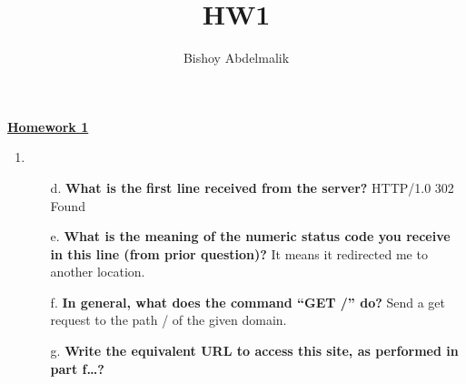 \documentclass{article}
\title{HW1}
\author{Bishoy Abdelmalik}
\begin{document}
\begin{center}
    \underline{\textbf{Homework 1}}
\end{center}    
\begin{enumerate}
    \item \begin{enumerate}
        \item[d.] \textbf{What is the first line received from the server? }\newline HTTP/1.0 302 Found
        \item[e.] \textbf{What is the meaning of the numeric status code you receive in this line (from prior 
        question)?} \newline It means it redirected me to another location.
        \item[f.] \textbf{In general, what does the command “GET /” do? }\newline Send a get request to the path / of the given domain.
        \item[g.] \textbf{Write the equivalent URL to access this site, as performed in part f…? }\newline
        
    \end{enumerate}
\end{enumerate}
\end{document}
